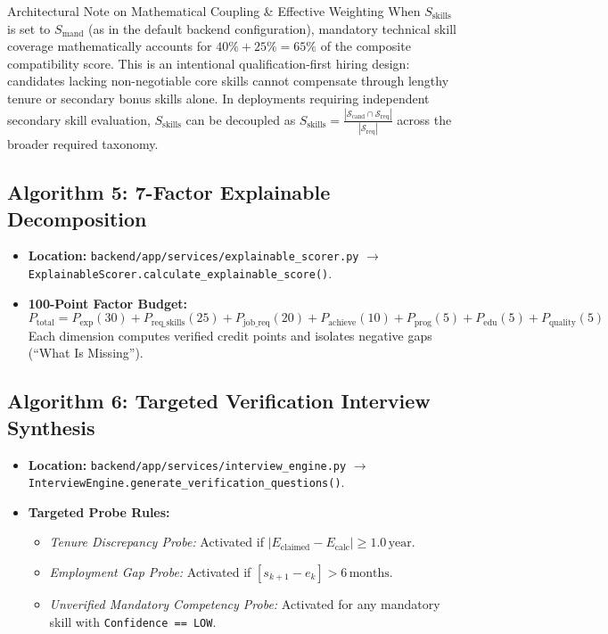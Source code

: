 \documentclass[11pt,a4paper]{report}
\begin{document}
\begin{warningbox}{Architectural Note on Mathematical Coupling \& Effective Weighting}
When $S_{\text{skills}}$ is set to $S_{\text{mand}}$ (as in the default backend configuration), mandatory technical skill coverage mathematically accounts for $40\% + 25\% = 65\%$ of the composite compatibility score. This is an intentional qualification-first hiring design: candidates lacking non-negotiable core skills cannot compensate through lengthy tenure or secondary bonus skills alone. In deployments requiring independent secondary skill evaluation, $S_{\text{skills}}$ can be decoupled as $S_{\text{skills}} = \frac{|\mathcal{S}_{\text{cand}} \cap \mathcal{S}_{\text{req}}|}{|\mathcal{S}_{\text{req}}|}$ across the broader required taxonomy.
\end{warningbox}

\subsection{Algorithm 5: 7-Factor Explainable Decomposition}
\begin{itemize}[leftmargin=1.5em]
    \item \textbf{Location:} \texttt{backend/app/services/explainable\_scorer.py} $\to$ \texttt{ExplainableScorer.calculate\_explainable\_score()}.
    \item \textbf{100-Point Factor Budget:}
    \begin{equation}
        P_{\text{total}} = P_{\text{exp}}(30) + P_{\text{req\_skills}}(25) + P_{\text{job\_req}}(20) + P_{\text{achieve}}(10) + P_{\text{prog}}(5) + P_{\text{edu}}(5) + P_{\text{quality}}(5)
    \end{equation}
    Each dimension computes verified credit points and isolates negative gaps (``What Is Missing'').
\end{itemize}

\subsection{Algorithm 6: Targeted Verification Interview Synthesis}
\begin{itemize}[leftmargin=1.5em]
    \item \textbf{Location:} \texttt{backend/app/services/interview\_engine.py} $\to$ \texttt{InterviewEngine.generate\_verification\_questions()}.
    \item \textbf{Targeted Probe Rules:}
    \begin{itemize}
        \item \emph{Tenure Discrepancy Probe:} Activated if $|E_{\text{claimed}} - E_{\text{calc}}| \ge 1.0\,\text{year}$.
        \item \emph{Employment Gap Probe:} Activated if $[s_{k+1} - e_k] > 6\,\text{months}$.
        \item \emph{Unverified Mandatory Competency Probe:} Activated for any mandatory skill with \texttt{Confidence == LOW}.
    \end{itemize}
\end{itemize}
\end{document}
